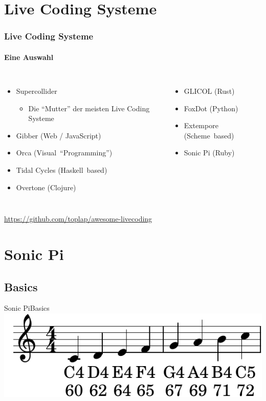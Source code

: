 \documentclass{beamer}
\begin{document}
\section{Live Coding Systeme}
\begin{frame}
  \frametitle{Live Coding Systeme}
  \framesubtitle{Eine Auswahl}
  \begin{columns}
    \begin{itemize}
      \item Supercollider
        \begin{itemize}
          \item Die ``Mutter'' der meisten Live Coding Systeme
        \end{itemize}
      \item Gibber (Web / JavaScript)
      \item Orca (Visual~``Programming'')
      \item Tidal Cycles (Haskell~based)
      \item Overtone (Clojure)
    \end{itemize}

    \begin{itemize}
      \item GLICOL (Rust)
      \item FoxDot (Python)
      \item Extempore (Scheme~based)
      \item Sonic Pi (Ruby)
    \end{itemize}
  \end{columns}
  \centering
  \vspace{1em}
  \url{https://github.com/toplap/awesome-livecoding}
\end{frame}

\section{Sonic Pi}
\subsection{Basics}
\begin{frame}{Sonic Pi}{Basics}
  \includegraphics{images/scale.pdf}
\end{frame}
\end{document}

